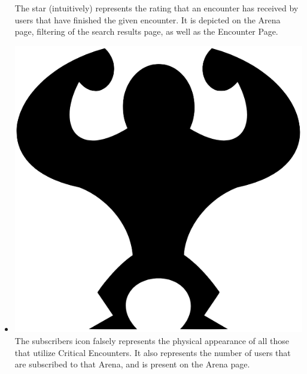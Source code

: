 \documentclass[12pt,a4paper]{report}
\begin{document}
\begin{itemize}
		The star (intuitively) represents the rating that an encounter has received by users that have finished the given encounter. It is depicted on the Arena page, filtering of the search results page, as well as the Encounter Page.
		\begin{figure}
			\label{fig: Rating Icon}
		\end{figure}
		\item \includegraphics[scale=.03]{subscribers_icon}
		The subscribers icon falsely represents the physical appearance of all those that utilize Critical Encounters. It also represents the number of users that are subscribed to that Arena, and is present on the Arena page.
		\begin{figure}
			\label{fig: Subscribers Icon}
		\end{figure}

\end{itemize}
\end{document}
